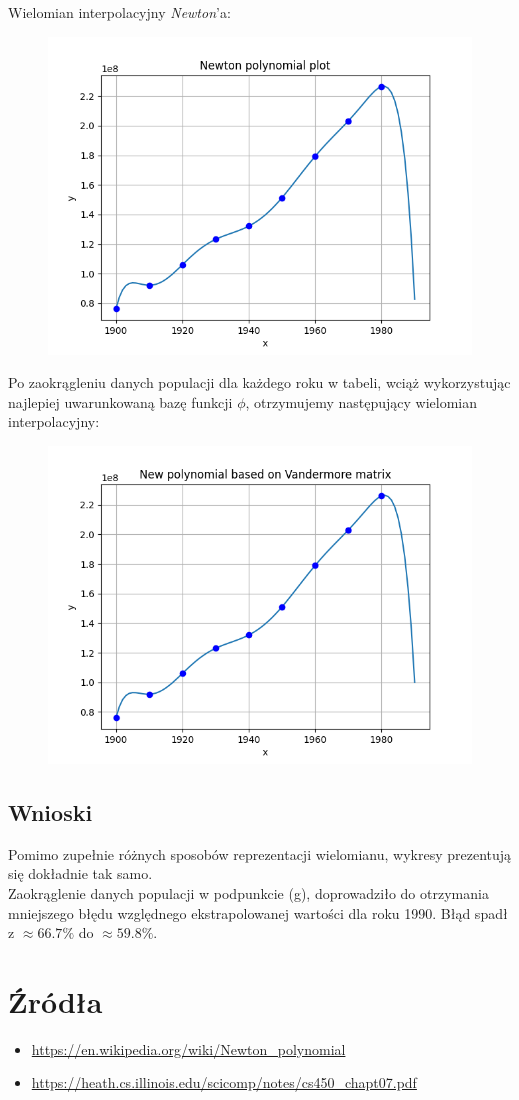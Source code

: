\documentclass{article}
\begin{document}
Wielomian interpolacyjny \textit{Newton}'a:
\begin{figure}[H]
  \includegraphics[width=\linewidth]{figures/newton.png}
\end{figure}
Po zaokrągleniu danych populacji dla każdego roku w tabeli, wciąż wykorzystując 
najlepiej uwarunkowaną bazę funkcji $\phi$, otrzymujemy następujący 
wielomian interpolacyjny:
\begin{figure}[H]
  \includegraphics[width=\linewidth]{figures/new_vandermore.png}
\end{figure}

\subsection*{Wnioski}
\null\quad Pomimo zupełnie różnych sposobów reprezentacji wielomianu, 
wykresy prezentują się dokładnie tak samo. \\
\null\quad Zaokrąglenie danych populacji w podpunkcie (g), 
doprowadziło do otrzymania mniejszego błędu względnego ekstrapolowanej 
wartości dla roku 1990. Błąd spadł z $\approx 66.7\%$ do $\approx 59.8\%$.

\section*{Źródła}
\begin{itemize}
    \item \url{https://en.wikipedia.org/wiki/Newton_polynomial}
    \item \url{https://heath.cs.illinois.edu/scicomp/notes/cs450_chapt07.pdf}
\end{itemize}
\end{document}
